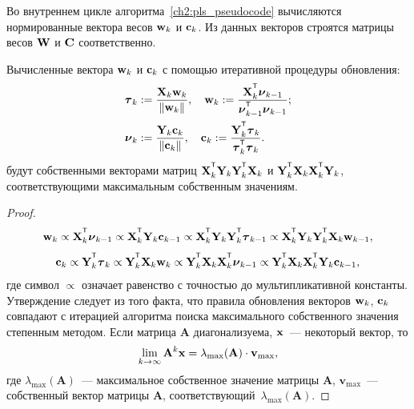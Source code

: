 Во внутреннем цикле алгоритма~\ref{ch2:pls_pseudocode} вычисляются нормированные вектора весов $\mathbf{w}_k$ и $\mathbf{c}_k$. 
Из данных векторов строятся матрицы весов $\mathbf{W}$ и $\mathbf{C}$ соответственно.

\begin{statement}
	\label{ch2:stat:eig}
	Вычисленные вектора $\mathbf{w}_k$ и $\mathbf{c}_k$ с помощью итеративной процедуры обновления:
	\begin{align}
		\btau_k &:= \frac{\bX_k \bw_k}{\|\bw_k\|}, \quad  \bw_k := \frac{\bX_k^{\T} \bnu_{k-1}}{\bnu_{k-1}^{\T} \bnu_{k-1}}; \label{ch2:eq:pls_step1}\\ 
		\bnu_k &:= \frac{\bY_k \bc_k}{\| \bc_k \|}, \quad \bc_k := \frac{\bY_k^{\T} \btau_k}{\btau_k^{\T} \btau_k}. \label{ch2:eq:pls_step2}
	\end{align}
	будут собственными векторами матриц $\bX_k^{\T} \bY_k \bY_k^{\T} \bX_k$ и $\bY_k^{\T} \bX_k \bX_k^{\T} \bY_k$, соответствующими максимальным собственным значениям.
\end{statement}
\begin{proof}
	\begin{equation*}
		\bw_k \propto \bX_k^{\T} \bnu_{k-1} \propto \bX_k^{\T} \bY_k \bc_{k-1} \propto \bX_k^{\T} \bY_k \bY_k^{\T} \btau_{k-1} \propto \bX_k^{\T} \bY_k \bY_k^{\T} \bX_k \bw_{k-1},
	\end{equation*}
	\begin{equation*}
		\bc_k \propto \bY_k^{\T} \btau_k \propto \bY_k^{\T} \bX_k \bw_k \propto \bY_k^{\T} \bX_k \bX_k^{\T} \bnu_{k-1} \propto \bY_k^{\T} \bX_k \bX_k^{\T} \bY_k \bc_{k-1},
	\end{equation*}
	где символ $\varpropto$ означает равенство с точностью до мультипликативной константы. 
	Утверждение следует из того факта, что правила обновления векторов $\mathbf{w}_k$, $\mathbf{c}_k$ совпадают с итерацией алгоритма поиска максимального собственного значения степенным методом.
	Если матрица $\mathbf{A}$ диагонализуема, $\mathbf{x}$~--- некоторый вектор, то
	\[
	\lim_{k \rightarrow \infty} \mathbf{A}^k \mathbf{x} = \lambda_{\max}(\mathbf{A}) \cdot \mathbf{v}_{\max},
	\]
	где $ \lambda_{\max} (\mathbf{A})$~--- максимальное собственное значение матрицы $\mathbf{A}$, $\mathbf{v}_{\max}$~--- собственный вектор матрицы $\mathbf{A}$, соответствующий~$\lambda_{\max} (\mathbf{A})$.
\end{proof}

